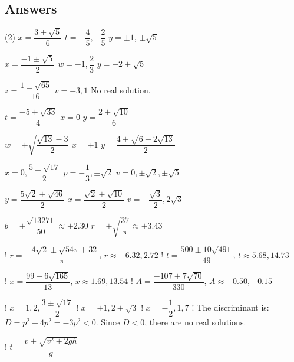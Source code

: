\clearpage

\subsection{Answers}

\begin{tasks}(2)
\task  $x = \dfrac{3 \pm \sqrt{5}}{6}$ 
\task  $t = -\dfrac{4}{5}, -\dfrac{2}{5}$ 
\task  $y = \pm 1$, $\pm \sqrt{5}$ 


\task $x = \dfrac{-1 \pm \sqrt{5}}{2}$
\task $w = -1, \dfrac{2}{3}$ 
\task $y = -2 \pm \sqrt{5}$


\task $z = \dfrac{1 \pm \sqrt{65}}{16}$
\task  $v = -3, 1$
\task No real solution.


\task $t = \dfrac{-5 \pm \sqrt{33}}{4}$
\task $x = 0$ 
\task $y = \dfrac{2 \pm \sqrt{10}}{6}$

\task $w = \pm \sqrt{\dfrac{\sqrt{13} - 3}{2}}$
\task $x = \pm 1$
\task $y = \dfrac{4 \pm \sqrt{6 + 2 \sqrt{13}}}{2}$

\task $x = 0, \dfrac{5 \pm \sqrt{17}}{2}$
\task $p = -\dfrac{1}{3}, \pm \sqrt{2}$ 
\task $v = 0, \pm \sqrt{2}, \pm \sqrt{5}$


\task $y = \dfrac{5\sqrt{2} \pm \sqrt{46}}{2}$
\task $x = \dfrac{\sqrt{2} \pm \sqrt{10}}{2}$
\task $v = -\dfrac{\sqrt{3}}{2}, 2\sqrt{3}$


\task $b = \pm \dfrac{\sqrt{13271}}{50} \approx \pm 2.30$
\task $r = \pm \sqrt{\dfrac{37}{\pi}} \approx \pm 3.43$ 

\task! $r = \dfrac{-4\sqrt{2} \pm \sqrt{54\pi + 32}}{\pi}$, $r \approx -6.32, 2.72$
\task! $t = \dfrac{500 \pm 10\sqrt{491}}{49}$, $t \approx 5.68, 14.73$

\task! $x = \dfrac{99 \pm 6 \sqrt{165}}{13}$, $x \approx 1.69, 13.54$
\task! $A = \dfrac{-107 \pm 7 \sqrt{70}}{330}$, $A \approx -0.50, -0.15$

\task! $x = 1, 2, \dfrac{3 \pm \sqrt{17}}{2}$
\task! $x = \pm 1, 2 \pm \sqrt{3}$ 
\task! $x = -\dfrac{1}{2}, 1, 7$
\task! The discriminant is: $D = p^2 - 4p^2 = -3p^2 < 0$.  Since $D < 0$, there are no real solutions.  

\task! $t = \dfrac{v \pm \sqrt{v^2 + 2gh}}{g}$

\end{tasks}
